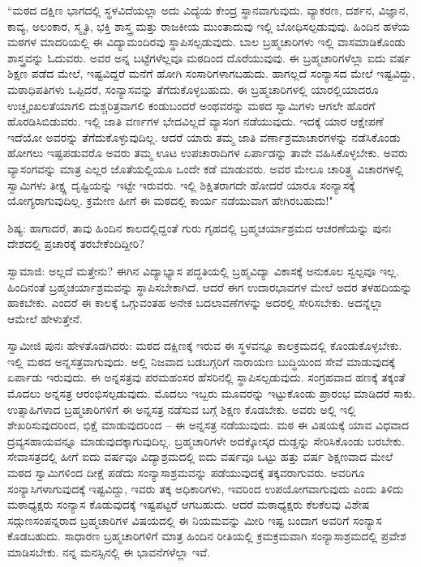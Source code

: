 “ಮಠದ ದಕ್ಷಿಣ ಭಾಗದಲ್ಲಿ ಸ್ಥಳವಿದೆಯಲ್ಲಾ ಅದು ವಿದ್ಯೆಯ ಕೇಂದ್ರ ಸ್ಥಾನವಾಗುವುದು. ವ್ಯಾಕರಣ, ದರ್ಶನ, ವಿಜ್ಞಾನ, ಕಾವ್ಯ, ಅಲಂಕಾರ, ಸ್ಮೃತಿ, ಭಕ್ತಿ ಶಾಸ್ತ್ರ ಮತ್ತು ರಾಜಕೀಯ ಮುಂತಾದುವು ಇಲ್ಲಿ ಬೋಧಿಸಲ್ಪಡುವುವು. ಹಿಂದಿನ ಹಳೆಯ ಮಠಗಳ ಮಾದರಿಯಲ್ಲಿ ಈ ವಿದ್ಯಾಮಂದಿರವು ಸ್ಥಾಪಿಸಲ್ಪಡುವುದು. ಬಾಲ ಬ್ರಹ್ಮಚಾರಿಗಳು ಇಲ್ಲಿ ವಾಸಮಾಡಿಕೊಂಡು ಶಾಸ್ತ್ರವನ್ನು ಓದುವರು. ಅವರ ಅನ್ನ ಬಟ್ಟೆಗಳೆಲ್ಲವೂ ಮಠದಿಂದ ದೊರೆಯುವುವು. ಈ ಬ್ರಹ್ಮಚಾರಿಗಳೆಲ್ಲಾ ಐದು ವರ್ಷ ಶಿಕ್ಷಣ ಪಡೆದ ಮೇಲೆ, ಇಷ್ಟವಿದ್ದರೆ ಮನೆಗೆ ಹೋಗಿ ಸಂಸಾರಿಗಳಾಗಬಹುದು. ಹಾಗಲ್ಲದೆ ಸಂನ್ಯಾಸದ ಮೇಲೆ ಇಷ್ಟವಿದ್ದು, ಮಠಾಧಿಪತಿಗಳು ಒಪ್ಪಿದರೆ, ಸಂನ್ಯಾಸವನ್ನು ತೆಗೆದುಕೊಳ್ಳಬಹುದು. ಈ ಬ್ರಹ್ಮಚಾರಿಗಳಲ್ಲಿ ಯಾರಲ್ಲಿಯಾದರೂ ಉಚ್ಛೃಂಖಲತೆಯಾಗಲಿ ದುಶ್ಚರಿತ್ರವಾಗಲಿ ಕಂಡುಬಂದರೆ ಅಂಥವರನ್ನು ಮಠದ ಸ್ವಾಮಿಗಳು ಆಗಲೇ ಹೊರಗೆ ಹೊರಡಿಸಿಬಿಡುವರು. ಇಲ್ಲಿ ಜಾತಿ ವರ್ಣಗಳ ಭೇದವಿಲ್ಲದೆ ವ್ಯಾಸಂಗ ನಡೆಯುವುದು. ಇದಕ್ಕೆ ಯಾರ ಆಕ್ಷೇಪಣೆ ಇದೆಯೋ ಅವರನ್ನು ತೆಗೆದುಕೊಳ್ಳುವುದಿಲ್ಲ. ಆದರೆ ಯಾರು ತಮ್ಮ ಜಾತಿ ವರ್ಣಾಶ್ರಮಾಚಾರಗಳನ್ನು ನಡೆಸಿಕೊಂಡು ಹೋಗಲು ಇಷ್ಟಪಡುವರೊ ಅವರು ತಮ್ಮ ಊಟ ಉಪಚಾರಾದಿಗಳ ಏರ್ಪಾಡನ್ನು ತಾವೇ ವಹಿಸಿಕೊಳ್ಳಬೇಕು. ಅವರು ವ್ಯಾಸಂಗವನ್ನು ಮಾತ್ರ ಎಲ್ಲರ ಜೊತೆಯಲ್ಲಿಯೂ ಒಂದೇ ಕಡೆ ಮಾಡುವರು. ಅವರ ಮೇಲೂ ಚಾರಿತ್ರ್ಯ ವಿಚಾರಗಳಲ್ಲಿ ಸ್ವಾಮಿಗಳು ತೀಕ್ಷ್ಣ ದೃಷ್ಟಿಯನ್ನು ಇಟ್ಟೇ ಇರುವರು. ಇಲ್ಲಿ ಶಿಕ್ಷಿತರಾಗದೇ ಹೋದರೆ ಯಾರೂ ಸಂನ್ಯಾಸಕ್ಕೆ ಯೋಗ್ಯರಾಗುವುದಿಲ್ಲ. ಕ್ರಮೇಣ ಹೀಗೆ ಈ ಮಠದಲ್ಲಿ ಕಾರ್ಯ ನಡೆಯುವಾಗ ಹೇಗಿರಬಹುದು!"

ಶಿಷ್ಯ: ಹಾಗಾದರೆ, ತಾವು ಹಿಂದಿನ ಕಾಲದಲ್ಲಿದ್ದಂತೆ ಗುರು ಗೃಹದಲ್ಲಿ ಬ್ರಹ್ಮಚರ್ಯಾಶ್ರಮದ ಆಚರಣೆಯನ್ನು ಪುನಃ ದೇಶದಲ್ಲಿ ಪ್ರಚಾರಕ್ಕೆ ತರಬೇಕೆಂದಿದ್ದೀರಿ?

ಸ್ವಾಮಾಜಿ: ಅಲ್ಲದೆ ಮತ್ತೇನು? ಈಗಿನ ವಿದ್ಯಾಭ್ಯಾಸ ಪದ್ಧತಿಯಲ್ಲಿ ಬ್ರಹ್ಮವಿದ್ಯಾ ವಿಕಾಸಕ್ಕೆ ಅನುಕೂಲ ಸ್ವಲ್ಪವೂ ಇಲ್ಲ. ಹಿಂದಿನಂತೆ ಬ್ರಹ್ಮಚರ್ಯಾಶ್ರಮವನ್ನು ಸ್ಥಾಪಿಸಬೇಕಾಗಿದೆ. ಆದರೆ ಈಗ ಉದಾರಭಾವಗಳ ಮೇಲೆ ಅದರ ತಳಹದಿಯನ್ನು ಹಾಕಬೇಕು. ಎಂದರೆ ಈ ಕಾಲಕ್ಕೆ ಒಗ್ಗುವಂತಹ ಅನೇಕ ಬದಲಾವಣೆಗಳನ್ನು ಅದರಲ್ಲಿ ಸೇರಿಸಬೇಕು. ಅದನ್ನೆಲ್ಲಾ ಆಮೇಲೆ ಹೇಳುತ್ತೇನೆ.

ಸ್ವಾಮೀಜಿ ಪುನಃ ಹೇಳತೊಡಗಿದರು: ಮಠದ ದಕ್ಷಿಣಕ್ಕೆ ಇರುವ ಈ ಸ್ಥಳವನ್ನೂ ಕಾಲಕ್ರಮದಲ್ಲಿ ಕೊಂಡುಕೊಳ್ಳಬೇಕು. ಇಲ್ಲಿ ಮಠದ ಅನ್ನಸತ್ರವಾಗುವುದು. ಅಲ್ಲಿ ನಿಜವಾದ ಬಡಬಗ್ಗರಿಗೆ ನಾರಾಯಣ ಬುದ್ಧಿಯಿಂದ ಸೇವೆ ಮಾಡುವುದಕ್ಕೆ ಏರ್ಪಾಡು ಇರುವುದು. ಈ ಅನ್ನಸತ್ರವು ಪರಮಹಂಸರ ಹೆಸರಿನಲ್ಲಿ ಸ್ಥಾಪಿಸಲ್ಪಡುವುದು. ಸಂಗ್ರಹವಾದ ಹಣಕ್ಕೆ ತಕ್ಕಂತೆ ಮೊದಲು ಅನ್ನಸತ್ರ ಆರಂಭಿಸಲ್ಪಡುವುದು. ಮೊದಲು ಇಬ್ಬರು ಮೂವರನ್ನು ಇಟ್ಟುಕೊಂಡು ಪ್ರಾರಂಭ ಮಾಡಿದರೆ ಸಾಕು. ಉತ್ಸಾಹಿಗಳಾದ ಬ್ರಹ್ಮಚಾರಿಗಳಿಗೆ ಈ ಅನ್ನಸತ್ರ ನಡೆಸುವ ಬಗ್ಗೆ ಶಿಕ್ಷಣ ಕೊಡಬೇಕು. ಅವರು ಅಲ್ಲಿ ಇಲ್ಲಿ ಶೇಖರಿಸುವುದರಿಂದ, ಭಿಕ್ಷೆ ಮಾಡುವುದರಿಂದ – ಈ ಅನ್ನಸತ್ರ ನಡೆಯುವುದು. ಮಠ ಈ ವಿಷಯಕ್ಕೆ ಯಾವ ವಿಧವಾದ ದ್ರವ್ಯಸಹಾಯವನ್ನೂ ಮಾಡುವುದಕ್ಕಾಗುವುದಿಲ್ಲ. ಬ್ರಹ್ಮಚಾರಿಗಳೇ ಅದಕ್ಕೋಸ್ಕರ ದುಡ್ಡನ್ನು ಸೇರಿಸಿಕೊಂಡು ಬರಬೇಕು. ಸೇವಾಸತ್ರದಲ್ಲಿ ಹೀಗೆ ಐದು ವರ್ಷವೂ ವಿದ್ಯಾಶ್ರಮದಲ್ಲಿ ಐದು ವರ್ಷವೂ ಒಟ್ಟು ಹತ್ತು ವರ್ಷ ಶಿಕ್ಷಣವಾದ ಮೇಲೆ ಮಠದ ಸ್ವಾಮಿಗಳಿಂದ ದೀಕ್ಷೆ ಪಡೆದು ಸಂನ್ಯಾಸಾಶ್ರಮವನ್ನು ಪಡೆಯುವುದಕ್ಕೆ ತಕ್ಕವರಾಗುವರು. ಅವರಿಗೂ ಸಂನ್ಯಾಸಿಗಳಾಗುವುದಕ್ಕೆ ಇಷ್ಟವಿದ್ದು, ಇವರು ತಕ್ಕ ಅಧಿಕಾರಿಗಳು, ಇವರಿಂದ ಉಪಯೋಗವಾಗುವುದು ಎಂದು ತಿಳಿದು ಮಠಾಧ್ಯಕ್ಷರು ಸಂನ್ಯಾಸ ಕೊಡುವುದಕ್ಕೆ ಇಷ್ಟಪಟ್ಟರೆ ಆಗಬಹುದು. ಆದರೆ ಮಠಾಧ್ಯಕ್ಷರು ಕೆಲಕೆಲವು ವಿಶೇಷ ಸದ್ಗುಣಸಂಪನ್ನರಾದ ಬ್ರಹ್ಮಚಾರಿಗಳ ವಿಷಯದಲ್ಲಿ ಈ ನಿಯಮವನ್ನು ಮೀರಿ ಇಷ್ಟ ಬಂದಾಗ ಅವರಿಗೆ ಸಂನ್ಯಾಸ ಕೊಡಬಹುದು. ಸಾಧಾರಣ ಬ್ರಹ್ಮಚಾರಿಗಳಿಗೆ ಮಾತ್ರ ಹಿಂದಿನ ರೀತಿಯಲ್ಲಿ ಕ್ರಮಕ್ರಮವಾಗಿ ಸಂನ್ಯಾಸಾಶ್ರಮದಲ್ಲಿ ಪ್ರವೇಶ ಮಾಡಿಸಬೇಕು. ನನ್ನ ಮನಸ್ಸಿನಲ್ಲಿ ಈ ಭಾವನೆಗಳೆಲ್ಲಾ ಇವೆ.

